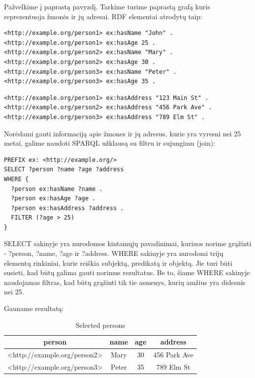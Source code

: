 \documentclass{VUMIFPSkursinis}
\begin{document}
Pažvelkime į paprastą pavyzdį. Tarkime turime paprastą grafą kuris reprezentuoja žmonės ir jų adresai.
RDF elementai atrodytų taip:

\begin{lstlisting}[captionpos=b, caption=Žmonių RDF, label=lst:sparql,
   basicstyle=\ttfamily,frame=single]
<http://example.org/person1> ex:hasName "John" .
<http://example.org/person1> ex:hasAge 25 .
<http://example.org/person2> ex:hasName "Mary" .
<http://example.org/person2> ex:hasAge 30 .
<http://example.org/person3> ex:hasName "Peter" .
<http://example.org/person3> ex:hasAge 35 .
\end{lstlisting}

\begin{lstlisting}[captionpos=b, caption=Adresų rdf, label=lst:sparql,
   basicstyle=\ttfamily,frame=single]
<http://example.org/person1> ex:hasAddress "123 Main St" .
<http://example.org/person2> ex:hasAddress "456 Park Ave" .
<http://example.org/person3> ex:hasAddress "789 Elm St" .
\end{lstlisting}

Norėdami gauti informaciją apie žmones ir jų adresus, kurie yra vyresni nei 25 metai, galime naudoti SPARQL užklausą su filtru ir sujungimu (join):
\begin{lstlisting}[captionpos=b, caption=Informaciją apie žmones ir jų adresus, label=lst:sparql,
   basicstyle=\ttfamily,frame=single]
PREFIX ex: <http://example.org/>
SELECT ?person ?name ?age ?address
WHERE {
  ?person ex:hasName ?name .
  ?person ex:hasAge ?age .
  ?person ex:hasAddress ?address .
  FILTER (?age > 25)
}
\end{lstlisting}
\pagebreak
SELECT sakinyje yra nurodomos kintamųjų pavadinimai, kuriuos norime grąžinti - ?person, ?name, ?age ir ?address. WHERE sakinyje yra nurodomi trijų elementų rinkiniai, kurie reiškia subjektą, predikatą ir objektą. Jie turi būti susieti, kad būtų galima gauti norimus rezultatus. Be to, šiame WHERE sakinyje naudojamas filtras, kad būtų grąžinti tik tie asmenys, kurių amžius yra didesnis nei 25.

Gauname rezultatą:

\begin{table}[h]
\centering
\begin{tabular}{|c|c|c|c|}
\hline
person & name & age & address \\
\hline
<http://example.org/person2> & Mary & 30 & 456 Park Ave \\
<http://example.org/person3> & Peter & 35 & 789 Elm St \\
\hline
\end{tabular}
\caption{Selected persons}
\end{table}
\end{document}
